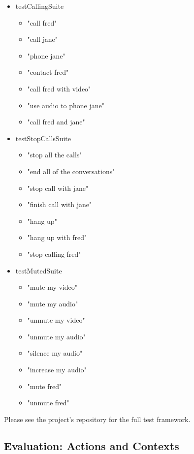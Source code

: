 \documentclass[11pt]{article}
\begin{document}
\begin{scriptsize}
\begin{itemize}
\item testCallingSuite
	\begin{itemize}
	\item "call fred"
	\item "call jane"
	\item "phone jane"
	\item "contact fred"
	\item "call fred with video"
	\item "use audio to phone jane"
	\item "call fred and jane"
	\end{itemize}
\item testStopCallsSuite
	\begin{itemize}
	\item "stop all the calls"
	\item "end all of the conversations"
	\item "stop call with jane"
	\item "finish call with jane"
	\item "hang up"
	\item "hang up with fred"
	\item "stop calling fred"
	\end{itemize}
\item testMutedSuite
	\begin{itemize}
	\item "mute my video"
	\item "mute my audio"
	\item "unmute my video"
	\item "unmute my audio"
	\item "silence my audio"
	\item "increase my audio"
	\item "mute fred"
	\item "unmute fred"
	\end{itemize}	
\end{itemize}
\end{scriptsize}

Please see the project's repository for the full test framework.

\newpage
\subsection{Evaluation: Actions and Contexts}
\label{appendix:evaluation-context-action-maps}
\end{document}

